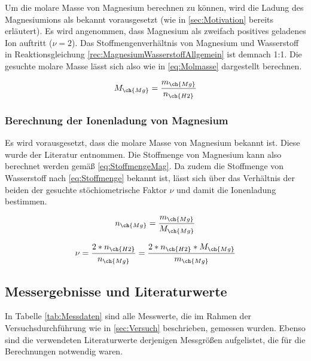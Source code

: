 \documentclass{article}
\begin{document}
        Um die molare Masse von Magnesium berechnen zu können, wird die Ladung des Magnesiumions als bekannt vorausgesetzt (wie in \ref{sec:Motivation} bereits erläutert). Es wird angenommen, dass Magnesium als zweifach positives geladenes Ion auftritt ($\nu = 2$). Das Stoffmengenverhältnis von Magnesium und Wasserstoff in Reaktionsgleichung \ref{rec:MagnesiumWasserstoffAllgemein} ist demnach 1:1. Die gesuchte molare Masse lässt sich also wie in \eqref{eq:Molmasse} dargestellt berechnen.
    
        \begin{equation}
          M_{\ch{Mg}} = \frac{m_{\ch{Mg}}}{n_{\ch{H2}}} \label{eq:Molmasse}
        \end{equation}
    
      \subsubsection{Berechnung der Ionenladung von Magnesium}
    
        Es wird vorausgesetzt, dass die molare Masse von Magnesium bekannt ist. Diese wurde der Literatur entnommen. Die Stoffmenge von Magnesium kann also berechnet werden gemäß \ref{eq:StoffmengeMag}. Da zudem die Stoffmenge von Wasserstoff nach \ref{eq:Stoffmenge} bekannt ist, lässt sich über das Verhältnis der beiden der gesuchte stöchiometrische Faktor $\nu$ und damit die Ionenladung bestimmen.
    
        \begin{equation}
          n_{\ch{Mg}} = \frac{m_{\ch{Mg}}}{M_{\ch{Mg}}} \label{eq:StoffmengeMag} 
        \end{equation}
    
        \begin{equation}
          \nu = \frac{2*n_{\ch{H2}}}{n_{\ch{Mg}}} = \frac{2*n_{\ch{H2}}*M_{\ch{Mg}}}{m_{\ch{Mg}}}
        \end{equation}
      
    \subsection{Messergebnisse und Literaturwerte}
    
      In Tabelle \ref{tab:Messdaten} sind alle Messwerte, die im Rahmen der Versuchsdurchführung wie in \ref{sec:Versuch} beschrieben, gemessen wurden. Ebenso sind die verwendeten Literaturwerte derjenigen Messgrößen aufgelistet, die für die Berechnungen notwendig waren.
      
\end{document}
